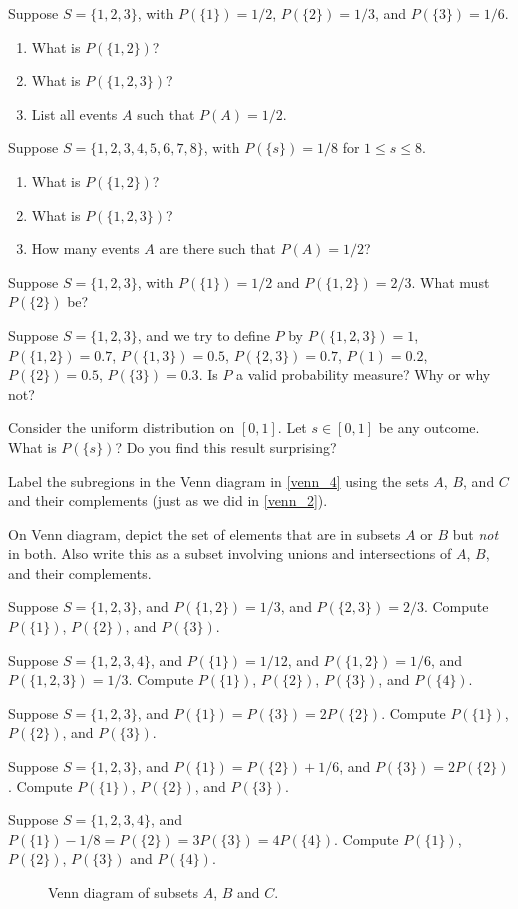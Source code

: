 \begin{exercises}
    \item Suppose $S=\{1,2,3\}$, with $P(\{1\})=1/2$, $P(\{2\})=1/3$, and $P(\{3\})=1/6$.
        \begin{enumerate}
            \item What is $P(\{1,2\})$?
            \item What is $P(\{1,2,3\})$?
            \item List all events $A$ such that $P(A)=1/2$.
        \end{enumerate}
    \item Suppose $S=\{1,2,3,4,5,6,7,8\}$, with $P(\{s\})=1/8$ for $1 \leqslant s \leqslant 8$.
        \begin{enumerate}
            \item What is $P(\{1,2\})$?
            \item What is $P(\{1,2,3\})$?
            \item How many events $A$ are there such that $P(A) = 1/2$?
        \end{enumerate}
    \item Suppose $S=\{1,2,3\}$, with $P(\{1\})=1/2$ and $P(\{1,2\})=2/3$. What must $P(\{2\})$ be?
    \item Suppose $S=\{1,2,3\}$, and we try to define $P$ by $P(\{1,2,3\})=1$, $P(\{1,2\})=0.7$, $P(\{1,3\})=0.5$,
    $P(\{2,3\})=0.7$, $P({1})=0.2$, $P(\{2\})=0.5$, $P(\{3\})=0.3$. Is $P$ a valid probability measure? Why or why
    not?
    \item Consider the uniform distribution on $[0,1]$. Let $s \in [0,1]$ be any outcome. What is $P(\{s\})$? Do you
    find this result surprising?
    \item Label the subregions in the Venn diagram in \autoref{venn_4} using the sets $A$, $B$, and $C$ and their
    complements (just as we did in \autoref{venn_2}).
    \item On Venn diagram, depict the set of elements that are in subsets $A$ or $B$ but \emph{not} in both. Also
    write this as a subset involving unions and intersections of $A$, $B$, and their complements.
    \item Suppose $S=\{1,2,3\}$, and $P(\{1,2\})=1/3$, and $P(\{2,3\})=2/3$. Compute $P(\{1\})$, $P(\{2\})$, and
    $P(\{3\})$.
    \item Suppose $S=\{1,2,3,4\}$, and $P(\{1\})=1/12$, and $P(\{1,2\})=1/6$, and $P(\{1,2,3\})=1/3$. Compute
    $P(\{1\})$, $P(\{2\})$, $P(\{3\})$, and $P(\{4\})$.
    \item Suppose $S=\{1,2,3\}$, and $P(\{1\})=P(\{3\})=2P(\{2\})$. Compute $P(\{1\})$, $P(\{2\})$, and $P(\{3\})$.
    \item Suppose $S=\{1,2,3\}$, and $P(\{1\})=P(\{2\})+1/6$, and $P(\{3\})=2P(\{2\})$. Compute $P(\{1\})$,
    $P(\{2\})$, and $P(\{3\})$.
    \item Suppose $S=\{1,2,3,4\}$, and $P(\{1\})-1/8=P(\{2\})=3P(\{3\})=4P(\{4\})$. Compute $P(\{1\})$, $P(\{2\})$,
    $P(\{3\})$ and $P(\{4\})$.
\end{exercises}
\begin{figure}[h]
    \caption{Venn diagram of subsets $A$, $B$ and $C$.}\label{venn_4}
\end{figure}

